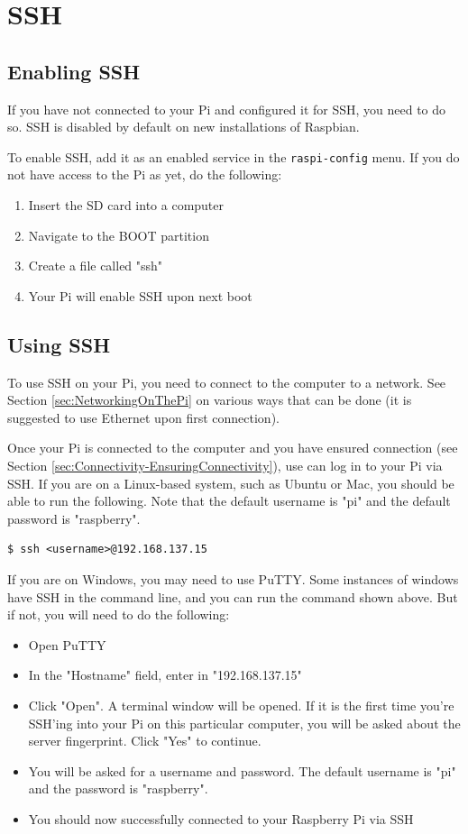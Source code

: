 \section{SSH}
\label{sec:SSH}
\subsection{Enabling SSH}
If you have not connected to your Pi and configured it for SSH, you need to do so. SSH is disabled by default on new installations of Raspbian.

To enable SSH, add it as an enabled service in the \verb|raspi-config| menu. If you do not have access to the Pi as yet, do the following:
\begin{enumerate}
    \item Insert the SD card into a computer 
    \item Navigate to the BOOT partition
    \item Create a file called "ssh" 
    \item Your Pi will enable SSH upon next boot
\end{enumerate}

\subsection{Using SSH}
To use SSH on your Pi, you need to connect to the computer to a network. See Section \ref{sec:NetworkingOnThePi} on various ways that can be done (it is suggested to use Ethernet upon first connection).

Once your Pi is connected to the computer and you have ensured connection (see Section \ref{sec:Connectivity-EnsuringConnectivity}), use can log in to your Pi via SSH. If you are on a Linux-based system, such as Ubuntu or Mac, you should be able to run the following. Note that the default username is "pi" and the default password is "raspberry".
\begin{lstlisting}
$ ssh <username>@192.168.137.15
\end{lstlisting}

If you are on Windows, you may need to use PuTTY. Some instances of windows have SSH in the command line, and you can run the command shown above. But if not, you will need to do the following:
\begin{itemize}
    \item Open PuTTY
    \item In the "Hostname" field, enter in "192.168.137.15"
    \item Click "Open". A terminal window will be opened. If it is the first time you're SSH'ing into your Pi on this particular computer, you will be asked about the server fingerprint. Click "Yes" to continue.
    \item You will be asked for a username and password. The default username is "pi" and the password is "raspberry".
    \item You should now successfully connected to your Raspberry Pi via SSH
\end{itemize}

